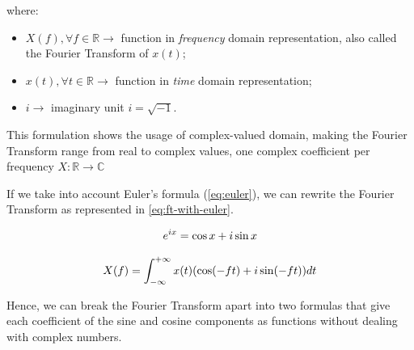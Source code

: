 \documentclass[
  oneside,
  11pt, a4paper,
  footinclude=true,
  headinclude=true,
  cleardoublepage=empty
]{scrbook}
\newcommand{\eqname}[1]{\tag*{#1}}%
\begin{document}
where: 

\begin{itemize}
    \item \( X(f), \forall f \in \mathbb{R} \rightarrow \) function in \textit{frequency} domain representation, also called the Fourier Transform of \( x(t) \);
    \item \( x(t), \forall t \in \mathbb{R} \rightarrow \) function in \textit{time} domain representation;
    \item \( i \rightarrow \) imaginary unit \( i = \sqrt{-1} \).
\end{itemize}

This formulation shows the usage of complex-valued domain, making the Fourier Transform range from real to complex values, one complex coefficient per frequency \( X : \mathbb{R} \rightarrow \mathbb{C} \) 

If we take into account Euler's formula (\autoref{eq:euler}), we can rewrite the Fourier Transform as represented in \autoref{eq:ft-with-euler}.

\begin{equation} \label{eq:euler}
    e^{ix} = \cos x + i \sin x \\ %
\end{equation}

\begin{equation} \label{eq:ft-with-euler}
    X(f) = \int_{-\infty}^{+\infty} x(t) (\cos (-f t) + i \sin (-f t)) dt \\
\end{equation}

Hence, we can break the Fourier Transform apart into two formulas that give each coefficient of the sine and cosine components as functions without dealing with complex numbers.
\end{document}
